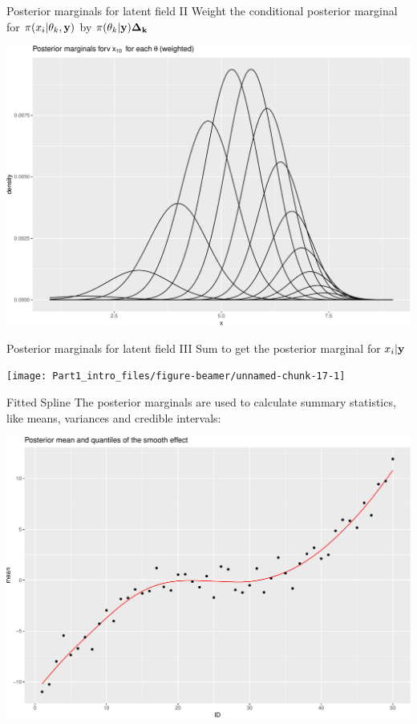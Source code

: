 \documentclass[
  ignorenonframetext,
]{beamer}
\begin{document}
\begin{frame}{Posterior marginals for latent field II}
\protect\hypertarget{posterior-marginals-for-latent-field-ii}{}
Weight the conditional posterior marginal for
\(\pi(x_i|\theta_k, \bf{y})\) by \(\pi(\theta_k|\bf{y})\Delta_k\)

\begin{center}\includegraphics[width=0.6\linewidth]{Part1_intro_files/figure-beamer/unnamed-chunk-16-1} \end{center}
\end{frame}

\begin{frame}{Posterior marginals for latent field III}
\protect\hypertarget{posterior-marginals-for-latent-field-iii}{}
Sum to get the posterior marginal for \(x_i|\bf{y}\)

\begin{center}\texttt{[image: Part1\_intro\_files/figure-beamer/unnamed-chunk-17-1]} \end{center}
\end{frame}

\begin{frame}{Fitted Spline}
\protect\hypertarget{fitted-spline}{}
The posterior marginals are used to calculate summary statistics, like
means, variances and credible intervals:

\begin{center}\includegraphics[width=0.6\linewidth]{Part1_intro_files/figure-beamer/unnamed-chunk-18-1} \end{center}
\end{frame}
\end{document}
